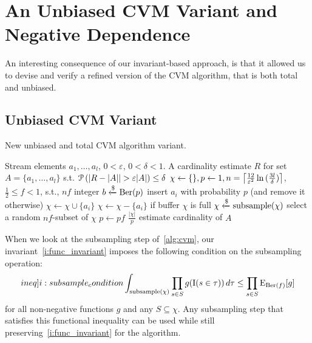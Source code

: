 \section{An Unbiased CVM Variant and Negative Dependence\label{sec:negdep}}

An interesting consequence of our invariant-based approach, is that it allowed us to devise and verify a refined version of the CVM algorithm, that is both total and unbiased.

\subsection{Unbiased CVM Variant}

\begin{algorithm}[t!]
	\caption{New unbiased and total CVM algorithm variant.}\label{alg:cvm_new}
	\begin{algorithmic}[1]
  \Require Stream elements $a_1,\dots,a_l$, $0 < \varepsilon$, $0 < \delta < 1$.
  \Ensure A cardinality estimate $R$ for set $A = \{ a_1,\dots,a_l \}$ s.t. $\prob \left( |R - |A| | > \varepsilon |A| \right) \leq \delta$
  \State $\chi \gets \{\}, p \gets 1, n = \ceil*{\frac{12}{\varepsilon^2} \ln{(\frac{3l}{\delta})} }$, $\frac{1}{2} \leq f < 1$, s.t., $nf$ integer
    \State $b \getsr \Ber(p)$ \Comment insert $a_i$ with probability $p$ (and remove it otherwise)
      \State $\chi \gets \chi \cup \{a_i\}$
    \Else
      \State $\chi \gets \chi - \{a_i\}$
    \EndIf
     \Comment if buffer $\chi$ is full
      \State $\chi \getsr \mathrm{subsample}(\chi)$ \Comment select a random $nf$-subset of $\chi$
      \State $p \gets pf$
    \EndIf
  \EndFor
  \State \Return $\frac{|\chi|}{p}$ \Comment estimate cardinality of $A$
  \end{algorithmic}
\end{algorithm}%


When we look at the subsampling step of~\cref{alg:cvm}, our invariant~\cref{i:func_invariant} imposes the following condition on the subsampling operation:
\begin{equation}\label[ineq]{i:subsample_condition}
  \int_{\mathrm{subsample}(\chi)} \prod_{s \in S} g(\indicat(s \in \tau)) \, d \tau \leq \prod_{s \in S} \expect_{\Ber(f)} [g]
\end{equation}
for all non-negative functions $g$ and any $S \subseteq \chi$.
Any subsampling step that satisfies this functional inequality can be used while still preserving~\cref{i:func_invariant} for the algorithm.

